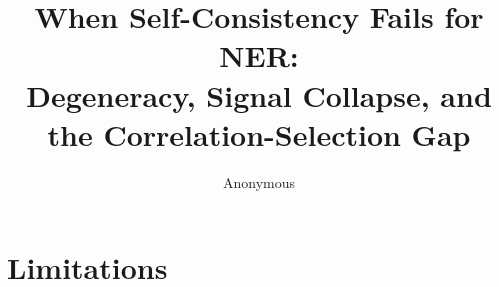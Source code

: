 \documentclass[11pt]{article}
\title{When Self-Consistency Fails for NER:\\ Degeneracy, Signal Collapse, and the Correlation-Selection Gap}
\author{Anonymous}
\begin{document}
\maketitle











\section*{Limitations}




\appendix
\renewcommand{\thesection}{\alphalph{\value{section}}}

\end{document}
